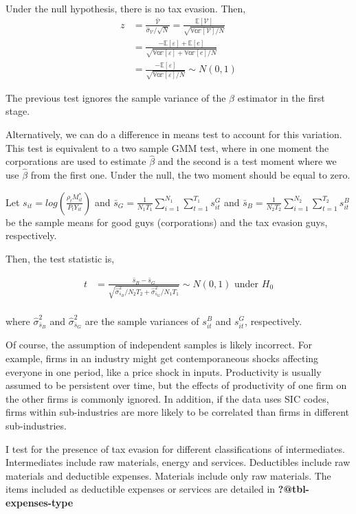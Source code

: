 \documentclass[
  12pt]{article}
\theoremstyle{definition}
\theoremstyle{remark}
\begin{document}
Under the null hypothesis, there is no tax evasion. Then, \[
\begin{aligned}  
  z &= \frac{\bar{\mathcal{V}}}{\hat\sigma_{\mathcal{V}}/\sqrt{N}}=\frac{\mathbb{E}[\mathcal{V}]}{\sqrt{\mathbb{Var}[\mathcal{V}]/N}}\\
  &=\frac{-\mathbb{E}[\varepsilon]+\mathbb{E}[e]}{\sqrt{\mathbb{Var}[\varepsilon]+\mathbb{Var}[e]/N}}\\
  &= \frac{-\mathbb{E}[\varepsilon]}{\sqrt{\mathbb{Var}[\varepsilon]/N}}\sim N(0,1)
\end{aligned}
\]

The previous test ignores the sample variance of the \(\beta\) estimator
in the first stage.

Alternatively, we can do a difference in means test to account for this
variation. This test is equivalent to a two sample GMM test, where in
one moment the corporations are used to estimate \(\hat\beta\) and the
second is a test moment where we use \(\hat\beta\) from the first one.
Under the null, the two moment should be equal to zero.

Let \(s_{it}=log\left(\frac{\rho_t M^*_{it}}{P_t Y_{it}}\right)\) and
\(\bar s_G= \frac{1}{N_1T_1}\sum_{i=1}^{N_1}\sum_{t=1}^{T_1}s_{it}^G\)
and
\(\bar s_B= \frac{1}{N_2T_2}\sum_{i=1}^{N_2}\sum_{t=1}^{T_2}s_{it}^B\)
be the sample means for good guys (corporations) and the tax evasion
guys, respectively.

Then, the test statistic is,

\[
\begin{aligned}  
  t &= \frac{\bar s_B - \bar s_G}{\sqrt{\hat\sigma^2_{\bar s_B}/N_2T_2 + \hat\sigma^2_{\bar s_G}/N_1T_1}} \sim N(0,1) \text{ under } H_0\\
\end{aligned}
\]

where \(\hat\sigma^2_{\bar s_B}\) and \(\hat\sigma^2_{\bar s_G}\) are
the sample variances of \(s_{it}^B\) and \(s_{it}^G\), respectively.

Of course, the assumption of independent samples is likely incorrect.
For example, firms in an industry might get contemporaneous shocks
affecting everyone in one period, like a price shock in inputs.
Productivity is usually assumed to be persistent over time, but the
effects of productivity of one firm on the other firms is commonly
ignored. In addition, if the data uses SIC codes, firms within
sub-industries are more likely to be correlated than firms in different
sub-industries.

I test for the presence of tax evasion for different classifications of
intermediates. Intermediates include raw materials, energy and services.
Deductibles include raw materials and deductible expenses. Materials
include only raw materials. The items included as deductible expenses or
services are detailed in \textbf{?@tbl-expenses-type}
\end{document}
